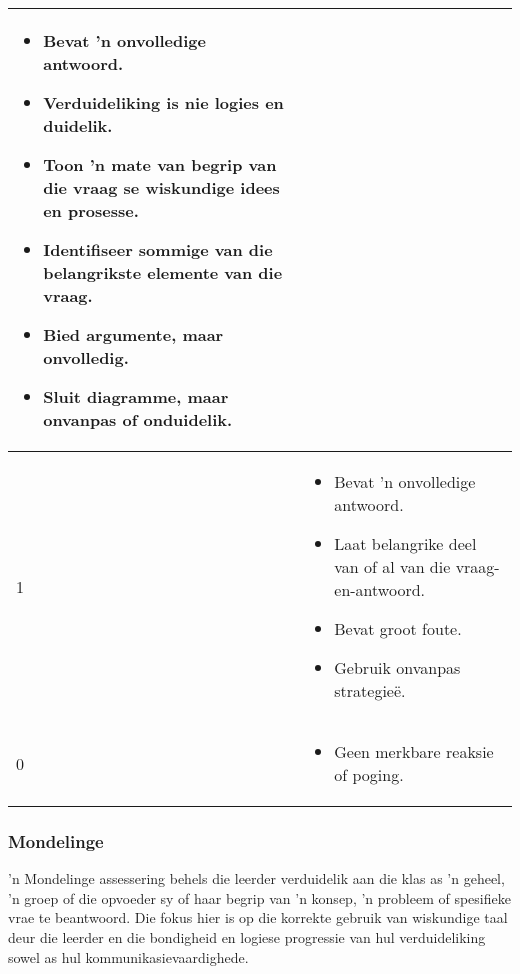 \begin{table}[H]
\begin{center}
\begin{tabular}{|p{3cm}|p{8.5cm}|}
\begin{itemize}[noitemsep]
\item
  Bevat 'n onvolledige antwoord.
\item
  Verduideliking is nie logies en duidelik.
\item
  Toon 'n mate van begrip van die vraag se wiskundige idees en prosesse.
\item
  Identifiseer sommige van die belangrikste elemente van die vraag.
\item
  Bied argumente, maar onvolledig.
\item
  Sluit diagramme, maar onvanpas of onduidelik.
\end{itemize} \\ \hline
1 &
\begin{itemize}[noitemsep]
\item
  Bevat 'n onvolledige antwoord.
\item
  Laat belangrike deel van of al van die vraag-en-antwoord.
\item
  Bevat groot foute.
\item
  Gebruik onvanpas strategie\"{e}.
\end{itemize} \\ \hline
0 &
\begin{itemize}[noitemsep]
\item
Geen merkbare reaksie of poging.
\end{itemize} \\ \hline
  \end{tabular}

 \end{center}

\end{table}

\subsubsection{Mondelinge}
'n Mondelinge assessering behels die leerder verduidelik aan die klas as 'n geheel, 'n groep of die opvoeder sy of haar begrip van 'n konsep, 'n probleem of spesifieke vrae te beantwoord. Die fokus hier is op die korrekte gebruik van wiskundige taal deur die leerder en die bondigheid en logiese progressie van hul verduideliking sowel as hul kommunikasievaardighede.

